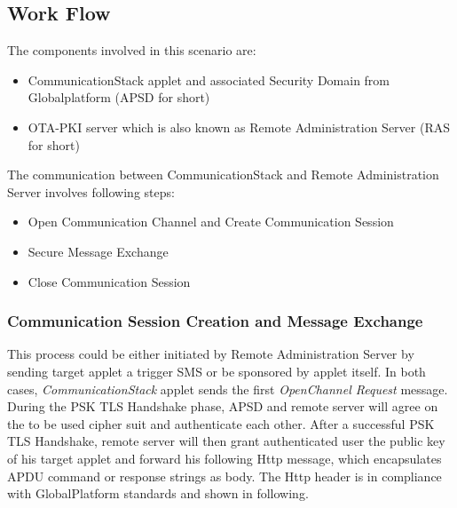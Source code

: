 \subsection {Work Flow}

The components involved in this scenario are:
 \begin{itemize}
  \item CommunicationStack applet and associated Security Domain from Globalplatform (APSD  for short)
  \item OTA-PKI server which is also known as Remote Administration Server (RAS for short)
\end{itemize}

The communication between CommunicationStack and Remote Administration Server involves following  steps:

 \begin{itemize}
  \item Open Communication Channel and Create Communication Session
  \item Secure Message Exchange
  \item Close Communication Session
\end{itemize}
\subsubsection{Communication Session Creation and Message Exchange}
This process could be either initiated by Remote Administration Server by sending target applet a trigger SMS or be sponsored by applet itself. In both cases, \emph{CommunicationStack} applet sends the first \emph{OpenChannel Request} message. During the PSK TLS Handshake phase, APSD and remote server will agree on the to be used cipher suit and authenticate each other. After a successful PSK TLS Handshake, remote server will then grant authenticated user the public key of his target applet and forward his following Http message, which encapsulates APDU command or response strings as body. The Http header is in compliance with GlobalPlatform standards and shown in following.


